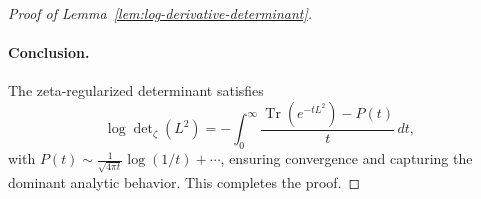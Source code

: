 \begin{proof}[Proof of Lemma~\ref{lem:log-derivative-determinant}]
\paragraph{Conclusion.}
The zeta-regularized determinant satisfies
\[
\log \det\nolimits_\zeta(L^2) = -\int_0^\infty \frac{\operatorname{Tr}(e^{-t L^2}) - P(t)}{t} \, dt,
\]
with \( P(t) \sim \frac{1}{\sqrt{4\pi t}} \log(1/t) + \cdots \), ensuring convergence and capturing the dominant analytic behavior. This completes the proof.
\end{proof}
